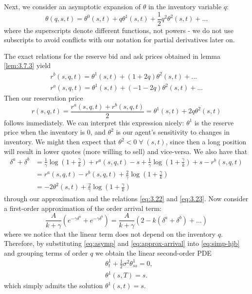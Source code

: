 Next, we consider an asymptotic expansion of $\theta$ in the inventory variable $q$:
\begin{equation}\label{eq:asymp}
    \theta(q,s,t)=\theta^0(s,t)+q\theta^1(s,t)+\frac{1}{2}q^2\theta^2(s,t)+...
\end{equation}
where the superscripts denote different functions, not powers - we do not use subscripts
to avoid conflicts with our notation for partial derivatives later on.

The exact relations for the reserve bid and ask prices obtained in lemma \ref{lem:3.7.3}
yield
\begin{gather}
    r^b(s,q,t)=\theta^1(s,t)+(1+2q)\theta^2(s,t)+...\\
    r^a(s,q,t)=\theta^1(s,t)+(-1-2q)\theta^2(s,t)+...
\end{gather}
Then our reservation price
\begin{equation}\label{eq:reserve-price}
    r(s,q,t)=\frac{r^a(s,q,t)+r^b(s,q,t)}{2}=\theta^1(s,t)+2q\theta^2(s,t)
\end{equation}
follows immediately. We can interpret this expression nicely: $\theta^1$ is the reserve
price when the inventory is 0, and $\theta^2$ is our agent's sensitivity to changes in 
inventory. We might then expect that $\theta^2 < 0\;\forall\;(s,t)$, since then a long 
position will result in lower quotes (more willing to sell) and vice-versa. We also 
have that
\begin{equation}\label{eq:spread}
    \begin{aligned}
        \delta^a+\delta^b&=\frac{1}{\gamma}\log\left(1+\frac{\gamma}{k}\right)+r^a(s,q,t)-s+\frac{1}{\gamma}\log\left(1+\frac{\gamma}{k}\right)+s-r^b(s,q,t)\\
        &=r^a(s,q,t)-r^b(s,q,t)+\frac{2}{\gamma}\log\left(1+\frac{\gamma}{k}\right)\\
        &=-2\theta^2(s,t)+\frac{2}{\gamma}\log\left(1+\frac{\gamma}{k}\right)
    \end{aligned}
\end{equation}
through our approximation and the relations \eqref{eq:3.22} and \eqref{eq:3.23}.
Now consider a first-order approximation of the order arrival term:
\begin{equation}\label{eq:approx-arrival}
    \frac{A}{k+\gamma}(e^{-\gamma\delta^a}+e^{-\gamma\delta^b})=\frac{A}{k+\gamma}(2-k(\delta^a+\delta^b)+...)
\end{equation}
where we notice that the linear term does not depend on the inventory $q$. Therefore,
by substituting \eqref{eq:asymp} and \eqref{eq:approx-arrival} into \eqref{eq:simp-hjb} 
and grouping terms of order $q$ we obtain the linear second-order PDE
\begin{equation}\label{eq:3.32}
    \begin{aligned} 
        &\theta^1_t+\frac{1}{2}\sigma^2\theta^1_{ss}=0,\\
        &\theta^1(s,T)=s.
    \end{aligned}
\end{equation}
which simply admits the solution $\theta^1(s,t)=s$. 

